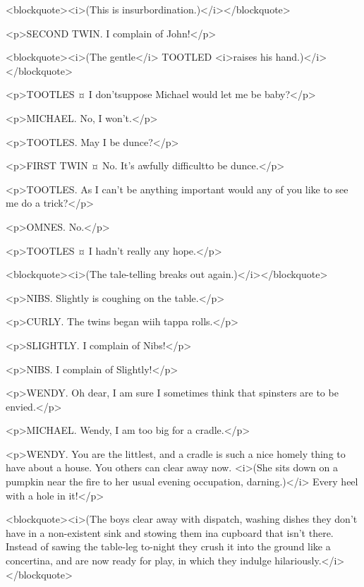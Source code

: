<blockquote><i>(This is insurbordination.)</i></blockquote>

<p>SECOND TWIN. I complain of John!</p>

<blockquote><i>(The gentle</i> TOOTLED <i>raises his hand.)</i></blockquote>

<p>TOOTLES ¤
I don'tsuppose Michael would let me be baby?</p>

<p>MICHAEL. No, I won't.</p>

<p>TOOTLES. May I be dunce?</p>

<p>FIRST TWIN ¤
No. It's awfully difficultto be dunce.</p>

<p>TOOTLES. As I can't be anything important would any of you like to see me do a trick?</p>

<p>OMNES. No.</p>

<p>TOOTLES ¤
I hadn't really any hope.</p>

<blockquote><i>(The tale-telling breaks out again.)</i></blockquote>

<p>NIBS. Slightly is coughing on the table.</p>

<p>CURLY. The twins began wiih tappa rolls.</p>

<p>SLIGHTLY. I complain of Nibs!</p>

<p>NIBS. I complain of Slightly!</p>

<p>WENDY. Oh dear, I am sure I sometimes think that spinsters are to be envied.</p>

<p>MICHAEL. Wendy, I am too big for a cradle.</p>

<p>WENDY. You are the littlest, and a cradle is such a nice homely thing to have about a house. You others can clear away now. <i>(She sits down on a pumpkin near the fire to her usual evening occupation, darning.)</i> Every heel with a hole in it!</p>

<blockquote><i>(The boys clear away with dispatch, washing dishes they don't have in a non-existent sink and stowing them ina cupboard that isn't there. Instead of sawing the table-leg to-night they crush it into the ground like a concertina, and are now ready for play, in which they indulge hilariously.</i></blockquote>


